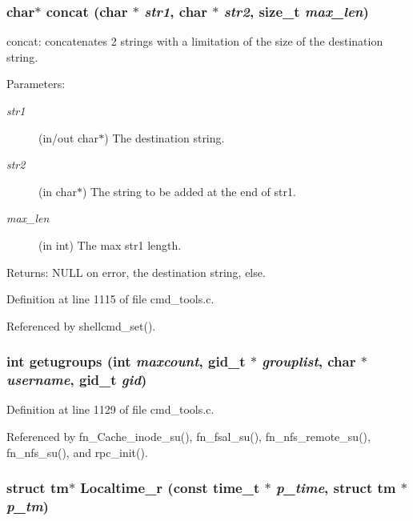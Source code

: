\subsubsection{\setlength{\rightskip}{0pt plus 5cm}char$\ast$ concat (char $\ast$ {\em str1}, char $\ast$ {\em str2}, size\_\-t {\em max\_\-len})}\label{cmd__tools_8c_a20}


concat: concatenates 2 strings with a limitation of the size of the destination string.

\begin{Desc}
\item[Parameters:]
\begin{description}
\item[{\em str1}](in/out char$\ast$) The destination string. \item[{\em str2}](in char$\ast$) The string to be added at the end of str1. \item[{\em max\_\-len}](in int) The max str1 length. \end{description}
\end{Desc}
\begin{Desc}
\item[Returns:]NULL on error, the destination string, else. \end{Desc}


Definition at line 1115 of file cmd\_\-tools.c.

Referenced by shellcmd\_\-set().
\subsubsection{\setlength{\rightskip}{0pt plus 5cm}int getugroups (int {\em maxcount}, gid\_\-t $\ast$ {\em grouplist}, char $\ast$ {\em username}, gid\_\-t {\em gid})}\label{cmd__tools_8c_a21}




Definition at line 1129 of file cmd\_\-tools.c.

Referenced by fn\_\-Cache\_\-inode\_\-su(), fn\_\-fsal\_\-su(), fn\_\-nfs\_\-remote\_\-su(), fn\_\-nfs\_\-su(), and rpc\_\-init().
\subsubsection{\setlength{\rightskip}{0pt plus 5cm}struct tm$\ast$ Localtime\_\-r (const time\_\-t $\ast$ {\em p\_\-time}, struct tm $\ast$ {\em p\_\-tm})}\label{cmd__tools_8c_a5}





